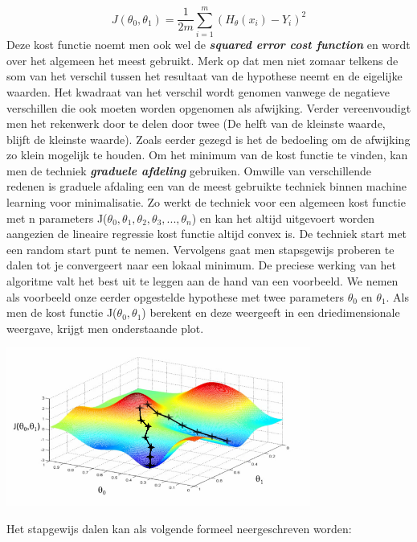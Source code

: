 \[J(\theta_{0},\theta_{1}) = \frac{1}{2m}\sum_{i=1}^{m} (H_{\theta}(x_i) - Y_i )^2\]
Deze kost functie noemt men ook wel de \textbf{\textit{squared error cost function}} en wordt over het algemeen het meest gebruikt. Merk op dat men niet zomaar telkens de som van het verschil tussen het resultaat van de hypothese neemt en de eigelijke waarden. Het kwadraat van het verschil wordt genomen vanwege de negatieve verschillen die ook moeten worden opgenomen als afwijking. Verder vereenvoudigt men het rekenwerk door te delen door twee (De helft van de kleinste waarde, blijft de kleinste waarde). 
\newline
Zoals eerder gezegd is het de bedoeling om de afwijking zo klein mogelijk te houden. Om het minimum van de kost functie te vinden, kan men de techniek \textbf{\textit{graduele afdeling}} gebruiken. Omwille van verschillende redenen is graduele afdaling een van de meest gebruikte techniek binnen machine learning voor minimalisatie. Zo werkt de techniek voor een algemeen kost functie met n parameters J($\theta_{0},\theta_{1},\theta_{2},\theta_{3}, ... ,\theta_{n}$) en kan het altijd uitgevoert worden aangezien de lineaire regressie kost functie altijd convex is.
\newline
De techniek start met een random start punt te nemen. Vervolgens gaat men stapsgewijs proberen te dalen tot je convergeert naar een lokaal minimum.
\newline
De preciese werking van het algoritme valt het best uit te leggen aan de hand van een voorbeeld. We nemen als voorbeeld onze eerder opgestelde hypothese met twee parameters $\theta_{0}$ en $\theta_{1}$. Als men de kost functie J($\theta_{0}, \theta_{1}$) berekent en deze weergeeft in een driedimensionale weergave, krijgt men onderstaande plot.
\begin{center}
  \includegraphics[width=10cm]{3d_plot}
\end{center}
%
Het stapgewijs dalen kan als volgende formeel neergeschreven worden:


